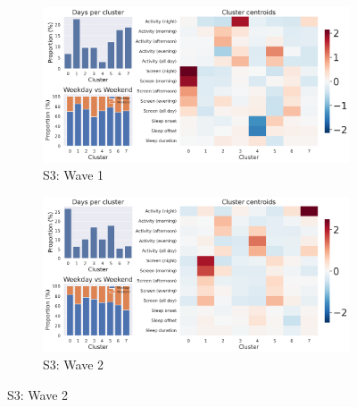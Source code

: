 \begin{appendices}
\begin{figure}[htbp]
  \begin{subfigure}[t]{0.48\textwidth}
    \centering
    \includegraphics[width=\textwidth]{figures/appendix/globem_INS-W_1_summary.png}
    \caption{S3: Wave 1}
    \label{fig:top-left}
  \end{subfigure}
  \hfill
  \begin{subfigure}[t]{0.48\textwidth}
    \centering
    \includegraphics[width=\textwidth]{figures/appendix/globem_INS-W_2_summary.png}
    \caption{S3: Wave 2}
    \label{fig:top-right}
  \end{subfigure}

  \medskip


\end{figure}
\end{appendices}
